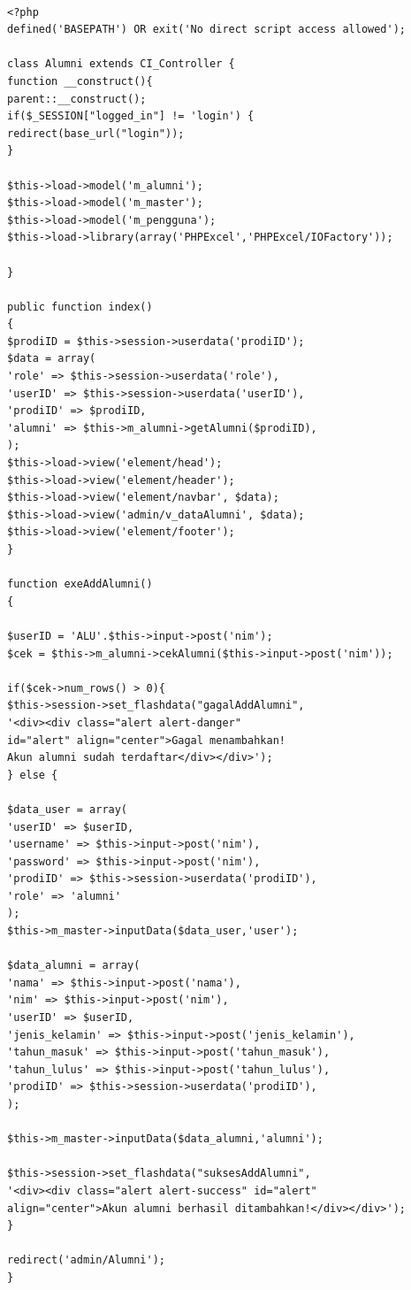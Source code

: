 \begin{verbatim}

<?php
defined('BASEPATH') OR exit('No direct script access allowed');

class Alumni extends CI_Controller {
function __construct(){
parent::__construct();
if($_SESSION["logged_in"] != 'login') {
redirect(base_url("login"));
}

$this->load->model('m_alumni');
$this->load->model('m_master');
$this->load->model('m_pengguna');
$this->load->library(array('PHPExcel','PHPExcel/IOFactory'));

}

public function index()
{
$prodiID = $this->session->userdata('prodiID');
$data = array(
'role' => $this->session->userdata('role'),
'userID' => $this->session->userdata('userID'),
'prodiID' => $prodiID,
'alumni' => $this->m_alumni->getAlumni($prodiID),
);
$this->load->view('element/head');
$this->load->view('element/header');
$this->load->view('element/navbar', $data);
$this->load->view('admin/v_dataAlumni', $data);
$this->load->view('element/footer');
}

function exeAddAlumni()
{

$userID = 'ALU'.$this->input->post('nim');
$cek = $this->m_alumni->cekAlumni($this->input->post('nim'));

if($cek->num_rows() > 0){
$this->session->set_flashdata("gagalAddAlumni", 
'<div><div class="alert alert-danger" 
id="alert" align="center">Gagal menambahkan! 
Akun alumni sudah terdaftar</div></div>');
} else {

$data_user = array(
'userID' => $userID,
'username' => $this->input->post('nim'),
'password' => $this->input->post('nim'),
'prodiID' => $this->session->userdata('prodiID'),
'role' => 'alumni'
);
$this->m_master->inputData($data_user,'user');

$data_alumni = array(
'nama' => $this->input->post('nama'),
'nim' => $this->input->post('nim'),
'userID' => $userID,
'jenis_kelamin' => $this->input->post('jenis_kelamin'),
'tahun_masuk' => $this->input->post('tahun_masuk'),
'tahun_lulus' => $this->input->post('tahun_lulus'),
'prodiID' => $this->session->userdata('prodiID'),
);

$this->m_master->inputData($data_alumni,'alumni');

$this->session->set_flashdata("suksesAddAlumni", 
'<div><div class="alert alert-success" id="alert" 
align="center">Akun alumni berhasil ditambahkan!</div></div>');
}

redirect('admin/Alumni');
}


\end{verbatim}
